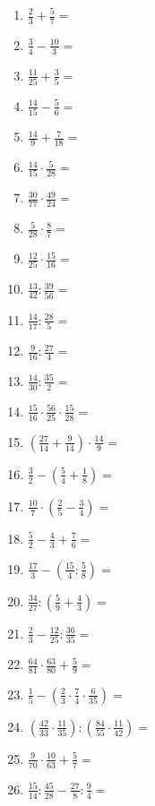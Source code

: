 \begin{Exercise}[title={Berechne die folgenden Ausdrücke und kürze soweit wie möglich}, label=bruecheA1]
	\begin{minipage}{\textwidth}
		\begin{minipage}{0.49\textwidth}
			\begin{enumerate}[label=\alph*)]
				\item \(\frac{2}{3}+\frac{5}{7}=\)
				\item \(\frac{3}{4}-\frac{10}{3}=\)
				\item \(\frac{11}{25}+\frac{3}{5}=\)
				\item \(\frac{14}{15}-\frac{5}{6}=\)
				\item \(\frac{14}{9}+\frac{7}{18}=\)
				\item \(\frac{14}{15}\cdot\frac{5}{28}=\)
				\item \(\frac{30}{77}\cdot\frac{49}{24}=\)
				\item \(\frac{5}{28}\cdot\frac{8}{7}=\)
				\item \(\frac{12}{25}\cdot\frac{15}{16}=\)
				\item \(\frac{13}{42}:\frac{39}{56}=\)
				\item \(\frac{14}{17}:\frac{28}{5}=\)
				\item \(\frac{9}{16}:\frac{27}{4}=\)
				\item \(\frac{14}{30}:\frac{35}{2}=\)
			\end{enumerate}
		\end{minipage}
		\begin{minipage}{0.49\textwidth}
			\begin{enumerate}[label=\alph*)]
				\setcounter{enumi}{13}
				\item \(\frac{15}{16}\cdot\frac{56}{25}\cdot\frac{15}{28}=\)
				\item \(\left( \frac{27}{14}+\frac{9}{14}\right) \cdot \frac{14}{9}=\)
				\item \(\frac{3}{2}-\left( \frac{5}{4}+\frac{1}{8}\right) =\)
				\item \(\frac{10}{7}\cdot\left( \frac{2}{5}-\frac{3}{4}\right) =\)
				\item \(\frac{5}{2}-\frac{4}{3}+\frac{7}{6}=\)
				\item \(\frac{17}{3}-\left( \frac{15}{4}:\frac{5}{8}\right) =\)
				\item \(\frac{34}{27}:\left( \frac{5}{9}+\frac{4}{3}\right) =\)
				\item \(\frac{2}{3}-\frac{12}{25}:\frac{36}{35}=\)
				\item \(\frac{64}{81}\cdot\frac{63}{80}+\frac{5}{9}=\)
				\item \(\frac{1}{5}-\left( \frac{2}{3}\cdot \frac{7}{4}\cdot \frac{6}{35}\right) =\)
				\item \(\left( \frac{42}{33}\cdot\frac{11}{35}\right):\left(\frac{84}{55}\cdot\frac{11}{42}\right)  =\)
				\item \(\frac{9}{70}\cdot\frac{10}{63}+\frac{5}{7}=\)
				\item \(\frac{15}{14}:\frac{45}{28}-\frac{27}{8}:\frac{9}{4}=\)
			\end{enumerate}
		\end{minipage}
	\end{minipage}
\end{Exercise}
